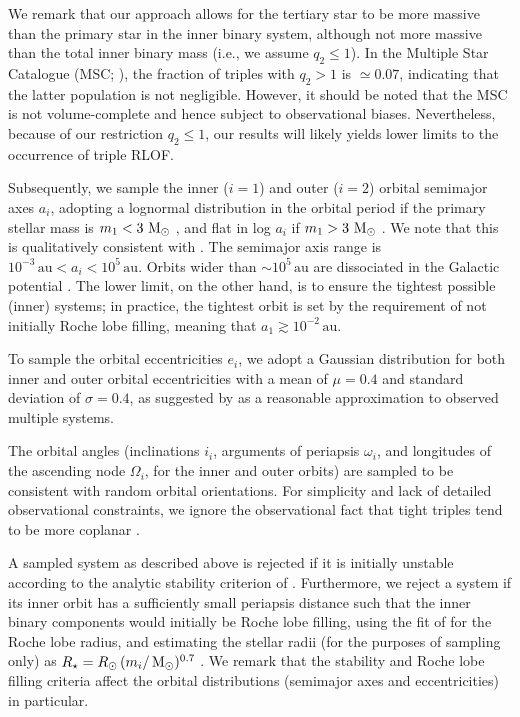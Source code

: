 \documentclass[twocolumn,appendixfloats,tighten]{aastex631}
\def\msun{{\rm\,M_\odot}}
\newcommand{\au}{\mathrm{au}}
\begin{document}
We remark that our approach allows for the tertiary star to be more massive than the primary star in the inner binary system, although not more massive than the total inner binary mass (i.e., we assume $q_2\leq 1$). In the Multiple Star Catalogue (MSC; \citealt{1997A&AS..124...75T,2018ApJS..235....6T}), the fraction of triples with $q_2 > 1$ is $\simeq 0.07$, indicating that the latter population is not negligible. However, it should be noted that the MSC is not volume-complete and hence subject to observational biases. Nevertheless, because of our restriction $q_2\leq 1$, our results will likely yields lower limits to the occurrence of triple RLOF. 

Subsequently, we sample the inner ($i=1$) and outer ($i=2$) orbital semimajor axes $a_i$, adopting a lognormal distribution in the orbital period if the primary stellar mass is $m_1<3\,\msun$ \citep{1991A&A...248..485D,2010ApJS..190....1R}, and flat in log $a_i$ if $m_1 > 3 \, \msun$ \citep{2007ApJ...670..747K}. We note that this is qualitatively consistent with \citet{2017ApJS..230...15M}. The semimajor axis range is $10^{-3} \, \au<a_i<10^5\,\au$. Orbits wider than $\sim 10^5\,\au$ are dissociated in the Galactic potential \citep[e.g.,][]{2018MNRAS.474.4412F}. The lower limit, on the other hand, is to ensure the tightest possible (inner) systems; in practice, the tightest orbit is set by the requirement of not initially Roche lobe filling, meaning that $a_1\gtrsim 10^{-2} \, \au$.

To sample the orbital eccentricities $e_i$, we adopt a Gaussian distribution for both inner and outer orbital eccentricities with a mean of $\mu=0.4$ and standard deviation of $\sigma=0.4$, as suggested by \citet{2013ARA&A..51..269D} as a reasonable approximation to observed multiple systems.

The orbital angles (inclinations $i_i$, arguments of periapsis $\omega_i$, and longitudes of the ascending node $\Omega_i$, for the inner and outer orbits) are sampled to be consistent with random orbital orientations. For simplicity and lack of detailed observational constraints, we ignore the observational fact that tight triples tend to be more coplanar \citep{2017ApJ...844..103T}.

A sampled system as described above is rejected if it is initially unstable according to the analytic stability criterion of \citet{2001MNRAS.321..398M}. Furthermore, we reject a system if its inner orbit has a sufficiently small periapsis distance such that the inner binary components would initially be Roche lobe filling, using the fit of \citet{1983ApJ...268..368E} for the Roche lobe radius, and estimating the stellar radii (for the purposes of sampling only) as $R_\star = R_\odot \, (m_i/\msun)^{0.7}$ \citep[e.g.,][]{1994sse..book.....K}. We remark that the stability and Roche lobe filling criteria affect the orbital distributions (semimajor axes and eccentricities) in particular. 
\end{document}
